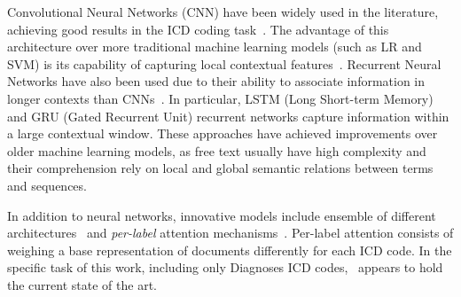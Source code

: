 \documentclass[runningheads]{llncs}
\begin{document}
Convolutional Neural Networks (CNN) have been widely used in the literature, achieving good results in the ICD coding task~\cite{liAutomatedICD9Coding2019a,liConvolutionalNeuralNetworks2017,mullenbachExplainablePredictionMedical2018}. The advantage of this architecture over more traditional machine learning models (such as LR and SVM) is its capability of capturing local contextual features~\cite{liAutomatedICD9Coding2019a}. Recurrent Neural Networks have also been used due to their ability to associate information in longer contexts than CNNs~\cite{huangEmpiricalEvaluationDeep2019,[ayyarTaggingPatientNotes2017],baumelMultiLabelClassificationPatient2017}. In particular, LSTM (Long Short-term Memory) and GRU (Gated Recurrent Unit) recurrent networks capture information within a large contextual window. These approaches have achieved improvements over older machine learning models, as free text usually have high complexity and their comprehension rely on local and global semantic relations between terms and sequences.

In addition to neural networks, innovative models include ensemble of different architectures~\cite{xieNeuralArchitectureAutomated2018,xuMultimodalMachineLearning2019} and \textit{per-label} attention mechanisms~\cite{liICDCodingClinical2019,mullenbachExplainablePredictionMedical2018}. Per-label attention consists of weighing a base representation of documents differently for each ICD code. In the specific task of this work, including only Diagnoses ICD codes,~\cite{mullenbachExplainablePredictionMedical2018} appears to hold the current state of the art.
\end{document}
